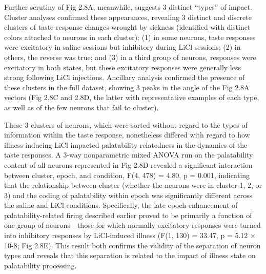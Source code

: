 \begin{refsection}
Further scrutiny of Fig 2.8A, meanwhile, suggests 3 distinct “types” of impact. Cluster analyses confirmed these appearances, revealing 3 distinct and discrete clusters of taste-response changes wrought by sickness (identified with distinct colors attached to neurons in each cluster): (1) in some neurons, taste responses were excitatory in saline sessions but inhibitory during LiCl sessions; (2) in others, the reverse was true; and (3) in a third group of neurons, responses were excitatory in both states, but these excitatory responses were generally less strong following LiCl injections. Ancillary analysis confirmed the presence of these clusters in the full dataset, showing 3 peaks in the angle of the Fig 2.8A vectors (Fig 2.8C and 2.8D, the latter with representative examples of each type, as well as of the few neurons that fail to cluster).

These 3 clusters of neurons, which were sorted without regard to the types of information within the taste response, nonetheless differed with regard to how illness-inducing LiCl impacted palatability-relatedness in the dynamics of the taste responses. A 3-way nonparametric mixed ANOVA run on the palatability content of all neurons represented in Fig 2.8D revealed a significant interaction between cluster, epoch, and condition, F(4, 478) = 4.80, p = 0.001, indicating that the relationship between cluster (whether the neurons were in cluster 1, 2, or 3) and the coding of palatability within epoch was significantly different across the saline and LiCl conditions. Specifically, the late epoch enhancement of palatability-related firing described earlier proved to be primarily a function of one group of neurons—those for which normally excitatory responses were turned into inhibitory responses by LiCl-induced illness (F(1, 130) = 33.47, p = 5.12 × 10-8; Fig 2.8E). This result both confirms the validity of the separation of neuron types and reveals that this separation is related to the impact of illness state on palatability processing.



\end{refsection}

